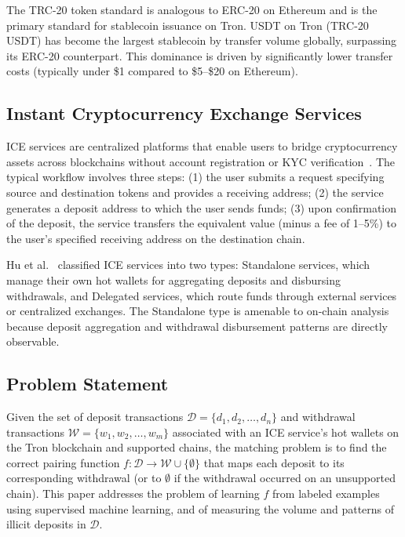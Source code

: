 \documentclass[journal]{IEEEtran}
\begin{document}
    The TRC-20 token standard is analogous to ERC-20 on Ethereum and is the primary standard for stablecoin issuance on Tron. USDT on Tron (TRC-20 USDT) has become the largest stablecoin by transfer volume globally, surpassing its ERC-20 counterpart. This dominance is driven by significantly lower transfer costs (typically under \$1 compared to \$5--\$20 on Ethereum).
    
    \subsection{Instant Cryptocurrency Exchange Services}
    
    ICE services are centralized platforms that enable users to bridge cryptocurrency assets across blockchains without account registration or KYC verification~\cite{hu2024ice}. The typical workflow involves three steps: (1) the user submits a request specifying source and destination tokens and provides a receiving address; (2) the service generates a deposit address to which the user sends funds; (3) upon confirmation of the deposit, the service transfers the equivalent value (minus a fee of 1--5\%) to the user's specified receiving address on the destination chain.
    
    Hu et al.~\cite{hu2024ice} classified ICE services into two types: Standalone services, which manage their own hot wallets for aggregating deposits and disbursing withdrawals, and Delegated services, which route funds through external services or centralized exchanges. The Standalone type is amenable to on-chain analysis because deposit aggregation and withdrawal disbursement patterns are directly observable.
    
    \subsection{Problem Statement}
    
    Given the set of deposit transactions $\mathcal{D} = \{d_1, d_2, \ldots, d_n\}$ and withdrawal transactions $\mathcal{W} = \{w_1, w_2, \ldots, w_m\}$ associated with an ICE service's hot wallets on the Tron blockchain and supported chains, the matching problem is to find the correct pairing function $f: \mathcal{D} \rightarrow \mathcal{W} \cup \{\emptyset\}$ that maps each deposit to its corresponding withdrawal (or to $\emptyset$ if the withdrawal occurred on an unsupported chain). This paper addresses the problem of learning $f$ from labeled examples using supervised machine learning, and of measuring the volume and patterns of illicit deposits in $\mathcal{D}$.
    
\end{document}
